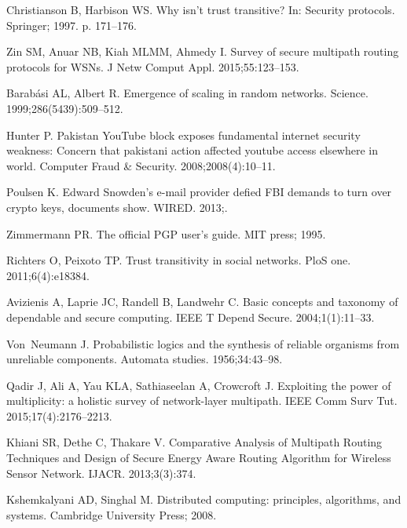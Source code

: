 \documentclass[10pt,letterpaper]{article}
\begin{document}
\begin{thebibliography}{10}
Christianson B, Harbison WS.
\newblock Why isn't trust transitive?
\newblock In: Security protocols. Springer; 1997. p. 171--176.

Zin SM, Anuar NB, Kiah MLMM, Ahmedy I.
\newblock Survey of secure multipath routing protocols for {WSNs}.
\newblock J Netw Comput Appl. 2015;55:123--153.

Barabási AL, Albert R.
\newblock Emergence of scaling in random networks.
\newblock Science. 1999;286(5439):509--512.

Hunter P.
\newblock Pakistan {YouTube} block exposes fundamental internet security
  weakness: {Concern} that pakistani action affected youtube access elsewhere
  in world.
\newblock Computer Fraud \& Security. 2008;2008(4):10--11.

Poulsen K.
\newblock Edward {Snowden}’s e-mail provider defied {FBI} demands to turn
  over crypto keys, documents show.
\newblock WIRED. 2013;.

Zimmermann PR.
\newblock The official {PGP} user's guide.
\newblock MIT press; 1995.

Richters O, Peixoto TP.
\newblock Trust transitivity in social networks.
\newblock PloS one. 2011;6(4):e18384.

Avizienis A, Laprie JC, Randell B, Landwehr C.
\newblock Basic concepts and taxonomy of dependable and secure computing.
\newblock IEEE T Depend Secure. 2004;1(1):11--33.

Von~Neumann J.
\newblock Probabilistic logics and the synthesis of reliable organisms from
  unreliable components.
\newblock Automata studies. 1956;34:43--98.

Qadir J, Ali A, Yau KLA, Sathiaseelan A, Crowcroft J.
\newblock Exploiting the power of multiplicity: a holistic survey of
  network-layer multipath.
\newblock IEEE Comm Surv Tut. 2015;17(4):2176--2213.

Khiani SR, Dethe C, Thakare V.
\newblock Comparative {Analysis} of {Multipath} {Routing} {Techniques} and
  {Design} of {Secure} {Energy} {Aware} {Routing} {Algorithm} for {Wireless}
  {Sensor} {Network}.
\newblock IJACR. 2013;3(3):374.

Kshemkalyani AD, Singhal M.
\newblock Distributed computing: principles, algorithms, and systems.
\newblock Cambridge University Press; 2008.


\end{thebibliography}
\end{document}
